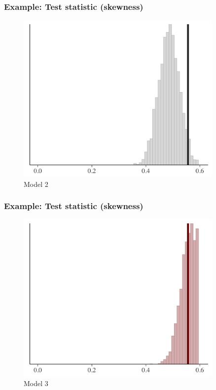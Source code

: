 \documentclass[10pt]{beamer}
\begin{document}
\begin{frame}
\frametitle{Example: Test statistic (skewness)}

\begin{figure}
\centering
\includegraphics[width=0.9\textwidth]{figs/ppc_skew2.png}
\caption{Model 2}
\end{figure}


\end{frame}

\begin{frame}
\frametitle{Example: Test statistic (skewness)}

\begin{figure}
\centering
\includegraphics[width=0.9\textwidth]{figs/ppc_skew3.png}
\caption{Model 3}
\end{figure}

\end{frame}

\end{document}
